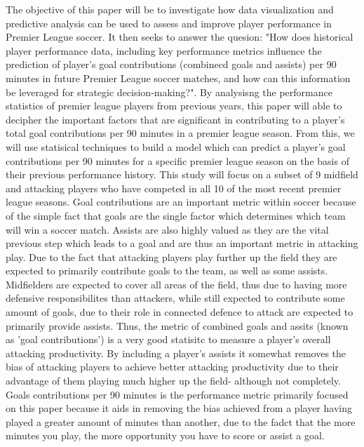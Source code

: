 \documentclass[12pt]{article}
\begin{document}
The objective of this paper will be to investigate how data visualization and
predictive analysis can be used to assess and improve player performance in
Premier League soccer. It then seeks to answer the quesion:
"How does historical player performance data, including key performance
metrics influence the prediction of player's goal contributions
(combinecd goals and assists) per 90 minutes in future Premier League 
soccer matches, and how can this information be leveraged for strategic 
decision-making?". 
By analysisng the performance statistics of premier league 
players from previous years, this paper will able to decipher the important
factors that are significant in contributing to a player's total goal
contributions per 90 minutes in a premier league season. From this, we will use 
statisical techniques to build a model which can predict a player's goal 
contributions per 90 minutes for a specific premier league season on the basis
of their previous performance history. 
This study will focus on a subset of 9 
midfield and attacking players who have competed in all 10 of the most recent 
premier league seasons. Goal contributions are an important metric within soccer
because of the simple fact that goals are the single factor which determines
which team will win a soccer match. Assists are also highly valued as they are
the vital previous step which leads to a goal and are thus an important metric
in attacking play.
Due to the fact that attacking players
play further up the field they are expected to primarily contribute goals to the 
team, as well as some assists.
Midfielders are expected to cover all areas of the field, thus due to having
more defensive responsibilites than attackers, while still expected to
contribute some amount of goals, due to their role in connected defence to
attack are expected to primarily provide assists. 
Thus, the metric of combined goals and assits (known as 'goal contributions') is 
a very good statisitc to measure a player's overall attacking productivity.
By including a player's assists it somewhat removes the bias of attacking players
to achieve better attacking productivity due to their advantage of them playing 
much higher up the field- although not completely. Goals contributions per 90 
minutes is the performance metric primarily focused on this paper because it
aids in removing the bias achieved from a player having played a greater amount 
of minutes than another, due to the fadct that the more minutes you play, the
more opportunity you have to score or assist a goal.
\end{document}
